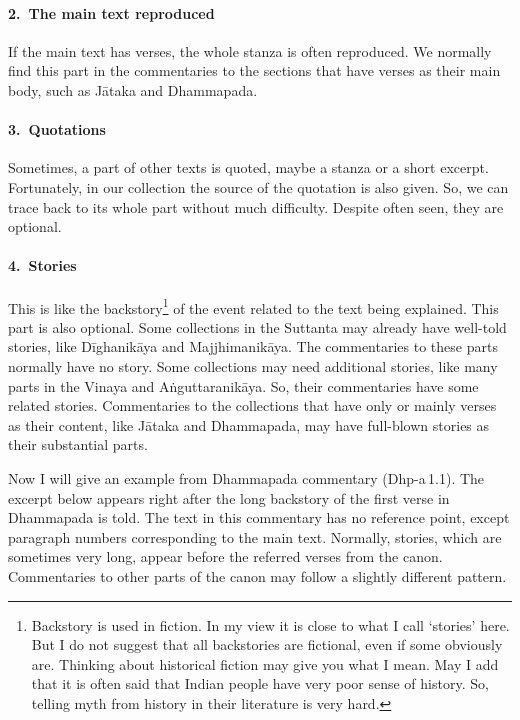 \paragraph*{2.\ The main text reproduced} If the main text has verses, the whole stanza is often reproduced. We normally find this part in the commentaries to the sections that have verses as their main body, such as J\=ataka and Dhammapada.
\paragraph*{3.\ Quotations} Sometimes, a part of other texts is quoted, maybe a stanza or a short excerpt. Fortunately, in our collection the source of the quotation is also given. So, we can trace back to its whole part without much difficulty. Despite often seen, they are optional.
\paragraph*{4.\ Stories} This is like the backstory\footnote{Backstory is used in fiction. In my view it is close to what I call `stories' here. But I do not suggest that all backstories are fictional, even if some obviously are. Thinking about historical fiction may give you what I mean. May I add that it is often said that Indian people have very poor sense of history. So, telling myth from history in their literature is very hard.} of the event related to the text being explained. This part is also optional. Some collections in the Suttanta may already have well-told stories, like D\=ighanik\=aya and Majjhimanik\=aya. The commentaries to these parts normally have no story. Some collections may need additional stories, like many parts in the Vinaya and A\.nguttaranik\=aya. So, their commentaries have some related stories. Commentaries to the collections that have only or mainly verses as their content, like J\=ataka and Dhammapada, may have full-blown stories as their substantial parts.

\bigskip
Now I will give an example from Dhammapada commentary (Dhp-a\,1.1). The excerpt below appears right after the long backstory of the first verse in Dhammapada is told. The text in this commentary has no reference point, except paragraph numbers corresponding to the main text. Normally, stories, which are sometimes very long, appear before the referred verses from the canon. Commentaries to other parts of the canon may follow a slightly different pattern.

